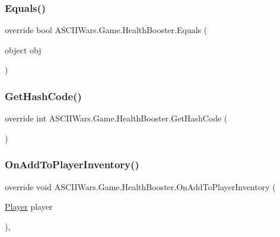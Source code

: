 \subsubsection{\texorpdfstring{Equals()}{Equals()}}
{\footnotesize\ttfamily override bool A\+S\+C\+I\+I\+Wars.\+Game.\+Health\+Booster.\+Equals (\begin{DoxyParamCaption}\item[{object}]{obj }\end{DoxyParamCaption})\hspace{0.3cm}{\ttfamily [inline]}}

\hypertarget{class_a_s_c_i_i_wars_1_1_game_1_1_health_booster_a79fdb10389338ad400f723a76ce30d7d}{}\label{class_a_s_c_i_i_wars_1_1_game_1_1_health_booster_a79fdb10389338ad400f723a76ce30d7d} 
\subsubsection{\texorpdfstring{Get\+Hash\+Code()}{GetHashCode()}}
{\footnotesize\ttfamily override int A\+S\+C\+I\+I\+Wars.\+Game.\+Health\+Booster.\+Get\+Hash\+Code (\begin{DoxyParamCaption}{ }\end{DoxyParamCaption})\hspace{0.3cm}{\ttfamily [inline]}}

\hypertarget{class_a_s_c_i_i_wars_1_1_game_1_1_health_booster_a99740fd21f80211f6a2058737b159425}{}\label{class_a_s_c_i_i_wars_1_1_game_1_1_health_booster_a99740fd21f80211f6a2058737b159425} 
\subsubsection{\texorpdfstring{On\+Add\+To\+Player\+Inventory()}{OnAddToPlayerInventory()}}
{\footnotesize\ttfamily override void A\+S\+C\+I\+I\+Wars.\+Game.\+Health\+Booster.\+On\+Add\+To\+Player\+Inventory (\begin{DoxyParamCaption}\item[{\hyperlink{class_a_s_c_i_i_wars_1_1_game_1_1_player}{Player}}]{player }\end{DoxyParamCaption})\hspace{0.3cm}{\ttfamily [inline]}, {\ttfamily [virtual]}}



